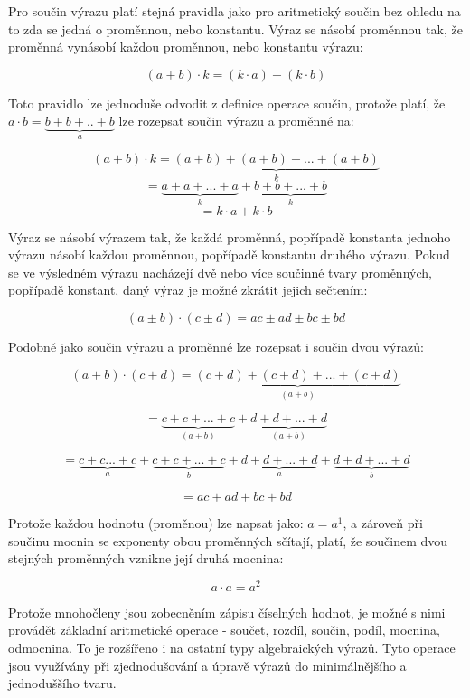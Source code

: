
Pro součin výrazu platí stejná pravidla jako pro aritmetický součin bez ohledu na to zda se jedná o proměnnou, nebo konstantu. Výraz se násobí proměnnou tak, že proměnná vynásobí každou proměnnou, nebo konstantu výrazu:

$$ (a + b) \cdot k = (k\cdot a) + (k \cdot b) $$

Toto pravidlo lze jednoduše odvodit z definice operace součin, protože platí, že $a \cdot b = \underbrace{b + b +.. +b}_a$ lze rozepsat součin výrazu a proměnné na:

$$ (a + b ) \cdot k = \underbrace{(a + b ) + (a + b ) +...+ (a + b )}_k$$
$$=\underbrace{a + a + ... +a}_k + \underbrace{b + b +...+b}_k$$
$$ = k\cdot a + k\cdot b $$


Výraz se násobí výrazem tak, že každá proměnná, popřípadě konstanta jednoho výrazu násobí každou proměnnou, popřípadě konstantu druhého výrazu. Pokud se ve výsledném výrazu nacházejí dvě nebo více součinné tvary proměnných, popřípadě konstant, daný výraz je možné zkrátit jejich sečtením:

$$ (a \pm b) \cdot (c \pm d) = ac \pm ad \pm bc \pm bd $$

Podobně jako součin výrazu a proměnné lze rozepsat i součin dvou výrazů:

$$(a + b) \cdot (c + d) = \underbrace{(c + d) + (c + d) + ... + (c + d)}_{(a + b)} $$

$$ = \underbrace{c + c + ...+c}_{(a + b)} + \underbrace{d + d + ... +d }_{(a + b)} $$

$$ = \underbrace{c + c ... +c}_{a} + \underbrace{c + c + ... +c}_{b} + \underbrace{d + d + ... +d}_{a} + \underbrace{d+d+...+d}_b $$

$$ = ac + ad + bc + bd $$

Protože každou hodnotu (proměnou) lze napsat jako: $a = a^1$, a zároveň při součinu mocnin se exponenty obou proměnných sčítají, platí, že součinem dvou stejných proměnných vznikne její druhá mocnina:

$$ a\cdot a = a^2 $$

Protože mnohočleny jsou zobecněním zápisu číselných hodnot, je možné s nimi provádět základní aritmetické operace - součet, rozdíl, součin, podíl, mocnina, odmocnina. To je rozšířeno i na ostatní typy algebraických výrazů. Tyto operace jsou využívány při zjednodušování a úpravě výrazů do minimálnějšího a jednoduššího tvaru.


